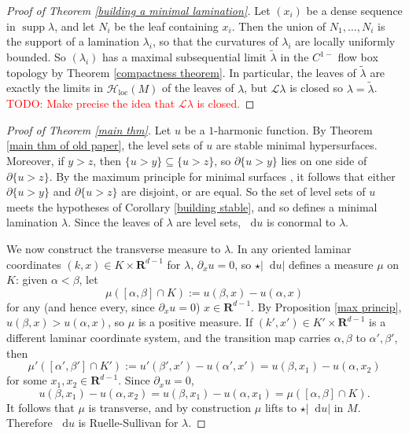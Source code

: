\documentclass[reqno,11pt]{amsart}
\newcommand{\RR}{\mathbf{R}}
\newcommand*\dif{\mathop{}\!\mathrm{d}}
\DeclareMathOperator{\supp}{supp}
\newcommand{\Leaves}{\mathscr L}
\newcommand{\Hypspace}{\mathscr H}
\newcommand{\loc}{\mathrm{loc}}
\theoremstyle{definition}
\numberwithin{equation}{section}
\newcommand\todo[1]{\textcolor{red}{TODO: #1}}
\begin{document}
\begin{proof}[Proof of Theorem \ref{building a minimal lamination}]
Let $(x_i)$ be a dense sequence in $\supp \lambda$, and let $N_i$ be the leaf containing $x_i$.
Then the union of $N_1, \dots, N_i$ is the support of a lamination $\lambda_i$, so that the curvatures of $\lambda_i$ are locally uniformly bounded.
So $(\lambda_i)$ has a maximal subsequential limit $\tilde \lambda$ in the $C^{1-}$ flow box topology by Theorem \ref{compactness theorem}.
In particular, the leaves of $\tilde \lambda$ are exactly the limits in $\Hypspace_\loc(M)$ of the leaves of $\lambda$, but $\Leaves \lambda$ is closed so $\lambda = \tilde \lambda$.
\todo{Make precise the idea that $\Leaves \lambda$ is closed.}
\end{proof}

\begin{proof}[Proof of Theorem \ref{main thm}]
Let $u$ be a $1$-harmonic function.
By Theorem \ref{main thm of old paper}, the level sets of $u$ are stable minimal hypersurfaces.
Moreover, if $y > z$, then $\{u > y\} \subseteq \{u > z\}$, so $\partial \{u > y\}$ lies on one side of $\partial \{u > z\}$.
By the maximum principle for minimal surfaces \cite[Corollary 1.28]{colding2011course}, it follows that either $\partial \{u > y\}$ and $\partial \{u > z\}$ are disjoint, or are equal.
So the set of level sets of $u$ meets the hypotheses of Corollary \ref{building stable}, and so defines a minimal lamination $\lambda$.
Since the leaves of $\lambda$ are level sets, $\dif u$ is conormal to $\lambda$.

We now construct the transverse measure to $\lambda$.
In any oriented laminar coordinates $(k, x) \in K \times \RR^{d - 1}$ for $\lambda$, $\partial_x u = 0$, so $\star |\dif u|$ defines a measure $\mu$ on $K$: given $\alpha < \beta$, let
$$\mu([\alpha, \beta] \cap K) := u(\beta, x) - u(\alpha, x)$$
for any (and hence every, since $\partial_x u = 0$) $x \in \RR^{d - 1}$.
By Proposition \ref{max princip}, $u(\beta, x) > u(\alpha, x)$, so $\mu$ is a positive measure.
If $(k', x') \in K' \times \RR^{d - 1}$ is a different laminar coordinate system, and the transition map carries $\alpha, \beta$ to $\alpha', \beta'$, then
$$\mu'([\alpha', \beta'] \cap K') := u'(\beta', x') - u(\alpha', x') = u(\beta, x_1) - u(\alpha, x_2)$$
for some $x_1, x_2 \in \RR^{d - 1}$. Since $\partial_x u = 0$,
$$u(\beta, x_1) - u(\alpha, x_2) = u(\beta, x_1) - u(\alpha, x_1) = \mu([\alpha, \beta] \cap K).$$
It follows that $\mu$ is transverse, and by construction $\mu$ lifts to $\star |\dif u|$ in $M$.
Therefore $\dif u$ is Ruelle-Sullivan for $\lambda$.


\end{proof}
\end{document}
